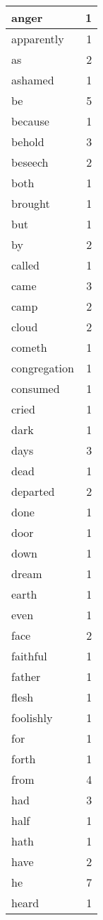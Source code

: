 \begin{center}
\begin{longtable}{l|r}
anger & 1 \\ \hline
apparently & 1 \\ \hline
as & 2 \\ \hline
ashamed & 1 \\ \hline
be & 5 \\ \hline
because & 1 \\ \hline
behold & 3 \\ \hline
beseech & 2 \\ \hline
both & 1 \\ \hline
brought & 1 \\ \hline
but & 1 \\ \hline
by & 2 \\ \hline
called & 1 \\ \hline
came & 3 \\ \hline
camp & 2 \\ \hline
cloud & 2 \\ \hline
cometh & 1 \\ \hline
congregation & 1 \\ \hline
consumed & 1 \\ \hline
cried & 1 \\ \hline
dark & 1 \\ \hline
days & 3 \\ \hline
dead & 1 \\ \hline
departed & 2 \\ \hline
done & 1 \\ \hline
door & 1 \\ \hline
down & 1 \\ \hline
dream & 1 \\ \hline
earth & 1 \\ \hline
even & 1 \\ \hline
face & 2 \\ \hline
faithful & 1 \\ \hline
father & 1 \\ \hline
flesh & 1 \\ \hline
foolishly & 1 \\ \hline
for & 1 \\ \hline
forth & 1 \\ \hline
from & 4 \\ \hline
had & 3 \\ \hline
half & 1 \\ \hline
hath & 1 \\ \hline
have & 2 \\ \hline
he & 7 \\ \hline
heard & 1 \\ \hline

\end{longtable}
\end{center}
